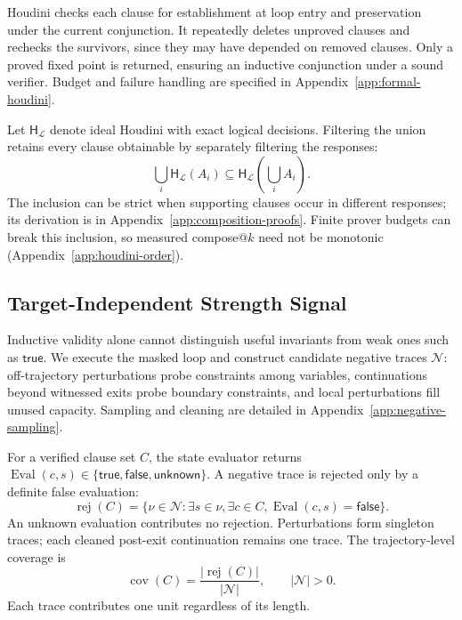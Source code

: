 Houdini checks each clause for establishment at loop entry and preservation
under the current conjunction.  It repeatedly deletes unproved clauses and
rechecks the survivors, since they may have depended on removed clauses.
Only a proved fixed point is returned, ensuring an inductive conjunction
under a sound verifier.  Budget and failure handling are specified in
Appendix~\ref{app:formal-houdini}.

Let \(\mathsf H_{\mathcal L}\) denote ideal Houdini with exact logical
decisions.  Filtering the union retains every clause obtainable by separately
filtering the responses:
\begin{equation}
 \bigcup_i\mathsf H_{\mathcal L}(A_i)
 \subseteq\mathsf H_{\mathcal L}\!\left(\bigcup_i A_i\right).
 \label{eq:main-pooling-inclusion}
\end{equation}
The inclusion can be strict when supporting clauses occur in different
responses; its derivation is in Appendix~\ref{app:composition-proofs}.
Finite prover budgets can break this inclusion, so measured compose@\(k\)
need not be monotonic (Appendix~\ref{app:houdini-order}).

\subsection{Target-Independent Strength Signal}
\label{sec:method:sampler}

Inductive validity alone cannot distinguish useful invariants from weak
ones such as \(\mathsf{true}\).  We execute the masked loop and construct
candidate negative traces \(\mathcal N\): off-trajectory perturbations probe
constraints among variables, continuations beyond witnessed exits probe
boundary constraints, and local perturbations fill unused capacity.  Sampling
and cleaning are detailed in Appendix~\ref{app:negative-sampling}.

For a verified clause set \(C\), the state evaluator returns
\(\operatorname{Eval}(c,s)\in\{\mathsf{true},\mathsf{false},\mathsf{unknown}\}\).
A negative trace is rejected only by a definite false evaluation:
\begin{equation}
 \operatorname{rej}(C)=\{\nu\in\mathcal N:\exists s\in\nu,\exists c\in C,
   \operatorname{Eval}(c,s)=\mathsf{false}\}.
 \label{eq:main-negative-rejection}
\end{equation}
An unknown evaluation contributes no rejection.  Perturbations form
singleton traces; each cleaned post-exit continuation remains one trace.
The trajectory-level coverage is
\begin{equation}
  \operatorname{cov}(C)=
  \frac{|\operatorname{rej}(C)|}{|\mathcal N|},
  \qquad |\mathcal N|>0.
  \label{eq:method-coverage}
\end{equation}
Each trace contributes one unit regardless of its length.

